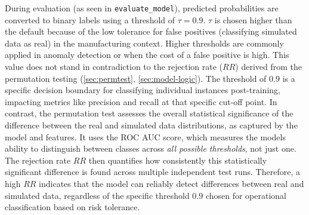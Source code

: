 During evaluation (as seen in \texttt{evaluate\_model}), predicted probabilities are converted to binary labels using a threshold of $\tau = 0.9$. $\tau$ is chosen higher than the default because of the low tolerance for false positives (classifying simulated data as real) in the manufacturing context. Higher thresholds are commonly applied in anomaly detection or when the cost of a false positive is high. This value does not stand in contradiction to the rejection rate ($RR$) derived from the permutation testing (\autoref{sec:permtest}, \autoref{sec:model-logic}). The threshold of $0.9$ is a specific decision boundary for classifying individual instances post-training, impacting metrics like precision and recall at that specific cut-off point. In contrast, the permutation test assesses the overall statistical significance of the difference between the real and simulated data distributions, as captured by the model and features. It uses the ROC AUC score, which measures the models ability to distinguish between classes across \textit{all possible thresholds}, not just one. The rejection rate $RR$ then quantifies how consistently this statistically significant difference is found across multiple independent test runs. Therefore, a high $RR$ indicates that the model can reliably detect differences between real and simulated data, regardless of the specific threshold $0.9$ chosen for operational classification based on risk tolerance.

